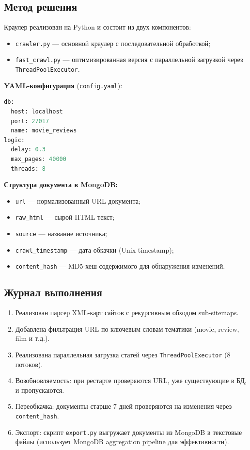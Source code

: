\documentclass[a4paper,12pt]{article}
\begin{document}
\subsection{Метод решения}

Краулер реализован на Python и состоит из двух компонентов:

\begin{itemize}
    \item \texttt{crawler.py} --- основной краулер с последовательной обработкой;
    \item \texttt{fast\_crawl.py} --- оптимизированная версия с параллельной загрузкой через \texttt{ThreadPoolExecutor}.
\end{itemize}

\textbf{YAML-конфигурация} (\texttt{config.yaml}):
\begin{lstlisting}[language=Python,caption=Формат конфигурации]
db:
  host: localhost
  port: 27017
  name: movie_reviews
logic:
  delay: 0.3
  max_pages: 40000
  threads: 8
\end{lstlisting}

\textbf{Структура документа в MongoDB:}
\begin{itemize}
    \item \texttt{url} --- нормализованный URL документа;
    \item \texttt{raw\_html} --- сырой HTML-текст;
    \item \texttt{source} --- название источника;
    \item \texttt{crawl\_timestamp} --- дата обкачки (Unix timestamp);
    \item \texttt{content\_hash} --- MD5-хеш содержимого для обнаружения изменений.
\end{itemize}

\subsection{Журнал выполнения}

\begin{enumerate}
    \item Реализован парсер XML-карт сайтов с рекурсивным обходом sub-sitemaps.
    \item Добавлена фильтрация URL по ключевым словам тематики (movie, review, film и т.д.).
    \item Реализована параллельная загрузка статей через \texttt{ThreadPoolExecutor} (8 потоков).
    \item Возобновляемость: при рестарте проверяются URL, уже существующие в БД, и пропускаются.
    \item Переобкачка: документы старше 7 дней проверяются на изменения через \texttt{content\_hash}.
    \item Экспорт: скрипт \texttt{export.py} выгружает документы из MongoDB в текстовые файлы (использует MongoDB aggregation pipeline для эффективности).
\end{enumerate}
\end{document}
